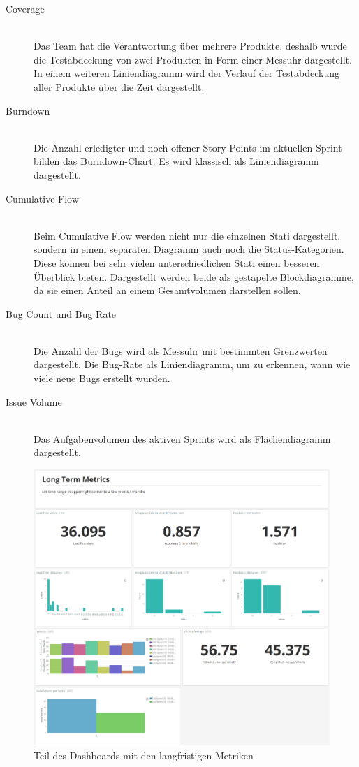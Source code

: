 \begin{description}
    \item[Coverage] \hfill \\ Das Team hat die Verantwortung über mehrere Produkte, deshalb wurde die Testabdeckung von zwei Produkten in Form einer Messuhr dargestellt. In einem weiteren Liniendiagramm wird der Verlauf der Testabdeckung aller Produkte über die Zeit dargestellt.
    \item[Burndown] \hfill \\ Die Anzahl erledigter und noch offener Story-Points im aktuellen Sprint bilden das Burndown-Chart. Es wird klassisch als Liniendiagramm dargestellt.
    \item[Cumulative Flow] \hfill \\ Beim Cumulative Flow werden nicht nur die einzelnen Stati dargestellt, sondern in einem separaten Diagramm auch noch die Status-Kategorien. Diese können bei sehr vielen unterschiedlichen Stati einen besseren Überblick bieten. Dargestellt werden beide als gestapelte Blockdiagramme, da sie einen Anteil an einem Gesamtvolumen darstellen sollen.
    \item[Bug Count und Bug Rate] \hfill \\ Die Anzahl der Bugs wird als Messuhr mit bestimmten Grenzwerten dargestellt. Die Bug-Rate als Liniendiagramm, um zu erkennen, wann wie viele neue Bugs erstellt wurden.
    \item[Issue Volume] \hfill \\ Das Aufgabenvolumen des aktiven Sprints wird als Flächendiagramm dargestellt.
\end{description}

\begin{savenotes}
    \begin{figure}[H] 
        \centering
            \includegraphics[width=1.0\textwidth]{img/dashboard-long-term.png}
        \caption{Teil des Dashboards mit den langfristigen Metriken}\label{fig:dashboard-long-term}
    \end{figure}
\end{savenotes}

